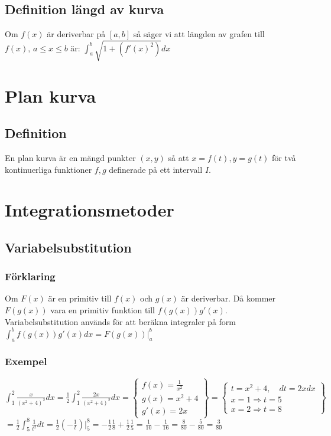 \documentclass{article}
\begin{document}
\subsection{Definition längd av kurva}
Om $f(x)$ är deriverbar på $[a,b]$ så säger vi att längden av grafen till\\
$f(x),\, a\leq x\leq b$ är: ${\displaystyle \int_{a}^{b}\sqrt{1+(f'(x)^2)}dx}$

\section{Plan kurva}
\subsection{Definition}
En plan kurva är en mängd punkter $(x,y)$ så att $x=f(t),y=g(t)$ för två kontinuerliga funktioner $f,g$ definerade på ett intervall $I$.

\newpage
\section{Integrationsmetoder}
\subsection{Variabelsubstitution}
\subsubsection{Förklaring}
Om $F(x)$ är en primitiv till $f(x)$ och $g(x)$ är deriverbar. Då kommer $F(g(x))$ vara en primitiv funktion till $f(g(x))g'(x)$. Variabelsubstitution används för att beräkna integraler på form ${\displaystyle\int_{a}^{b}f(g(x))g'(x)dx=F(g(x))\bigg\vert_{a}^{b}}$

\subsubsection{Exempel}
${\displaystyle \int_{1}^{2}\frac{x}{(x^2+4)^2}dx = \frac{1}{2}\int_{1}^{2}\frac{2x}{(x^2+4)^2}dx = \left\{
\begin{array}{l}
    f(x) = \frac{1}{x^2}   \\
    g(x) = x^2+4           \\
    g'(x)= 2x
\end{array}
\right\} = \left\{
\begin{array}{l}
    t=x^2+4,\quad dt=2xdx \\
    x=1 \Rightarrow t=5 \\
    x=2 \Rightarrow t=8
\end{array}
\right\}}$ \\
${\displaystyle= \frac{1}{2}\int_{5}^{8}\frac{1}{t^2}dt = \frac{1}{2}(-\frac{1}{t})\bigg\vert_{5}^{8}=-\frac{1}{2}\frac{1}{8}+\frac{1}{2}\frac{1}{5}=\frac{1}{10}-\frac{1}{16}=\frac{8}{80}-\frac{5}{80}=\frac{3}{80}}$
\end{document}
